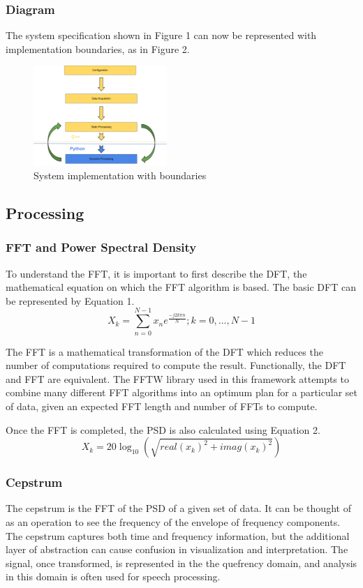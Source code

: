\documentclass[journal]{IEEEtran}
\begin{document}
\subsubsection{Diagram}
The system specification shown in Figure 1 can now be represented with implementation boundaries, as in Figure 2.
\begin{figure}[h!]
\centering
  \includegraphics[width=0.45\textwidth]{fig2.png}
\caption{System implementation with boundaries}
\end{figure}

\subsection{Processing}
\subsubsection{FFT and Power Spectral Density}
To understand the FFT, it is important to first describe the DFT, the mathematical equation on which the FFT algorithm is based.
The basic DFT can be represented by Equation 1. \cite{DSPBook}
\begin{equation}
X_k = \sum_{n=0}^{N-1}x_ne^{\frac{-j2k\pi n}{N}};k = 0,...,N-1
\end{equation}

The FFT is a mathematical transformation of the DFT which reduces the number of computations required to compute the result. 
Functionally, the DFT and FFT are equivalent. The FFTW library used in this framework attempts to combine many different FFT algorithms into
 an optimum plan for a particular set of data, given an expected FFT length and number of FFTs to compute.

Once the FFT is completed, the PSD is also calculated using Equation 2. \cite{DSPBook}
\begin{equation}
X_k = 20\log_{10}(\sqrt{real(x_k)^2 + imag(x_k)^2})
\end{equation}

\subsubsection{Cepstrum}
The cepstrum is the FFT of the PSD of a given set of data. It can be thought of as an operation to see the frequency of the envelope of
 frequency components. The cepstrum captures both time and frequency information, but the additional layer of abstraction can cause confusion in 
visualization and interpretation. The signal, once transformed, is represented in the the quefrency domain, and analysis in this domain is 
often used for speech processing. \cite{DSPBook, AudioBook}
\end{document}
